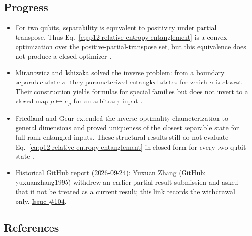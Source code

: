 \subsection*{Progress}

\begin{itemize}
  \item For two qubits, separability is equivalent to positivity under partial
  transpose.  Thus Eq.~\eqref{eq:p12-relative-entropy-entanglement} is a convex
  optimization over the positive-partial-transpose set, but this equivalence
  does not produce a closed optimizer
  .

  \item Miranowicz and Ishizaka solved the inverse problem: from a boundary
  separable state $\sigma$, they parameterized entangled states for which
  $\sigma$ is closest.  Their construction yields formulas for special
  families but does not invert to a closed map $\rho\mapsto\sigma_\rho$ for an
  arbitrary input
  .

  \item Friedland and Gour extended the inverse optimality characterization to
  general dimensions and proved uniqueness of the closest separable state for
  full-rank entangled inputs.  These structural results still do not evaluate
  Eq.~\eqref{eq:p12-relative-entropy-entanglement} in closed form for every
  two-qubit state
  .

  \item Historical GitHub report (2026-09-24): Yuxuan Zhang (GitHub: yuxuanzhang1995) withdrew an earlier partial-result submission and asked that it not be treated as a current result; this link records the withdrawal only. \href{https://github.com/Naixu-Guo/quantum-open-problems/issues/104}{Issue \#104}.
\end{itemize}

\subsection*{References}

